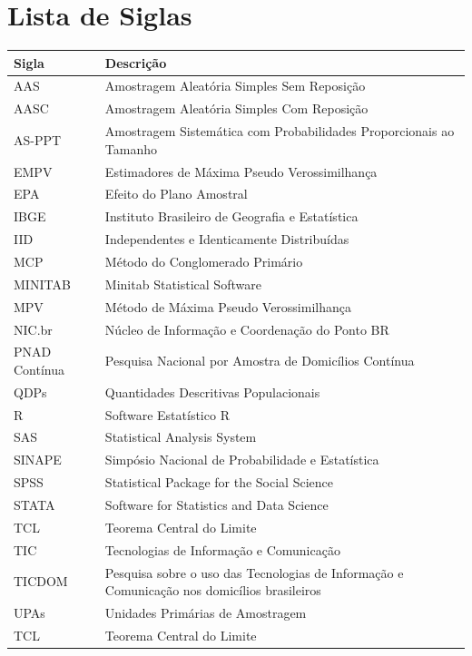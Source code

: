 \documentclass[
  12pt,
  brazilian,
]{book}
\theoremstyle{definition}
\theoremstyle{definition}
\theoremstyle{definition}
\theoremstyle{definition}
\theoremstyle{remark}
\begin{document}
\hypertarget{lista-de-siglas}{%
\chapter*{Lista de Siglas}\label{lista-de-siglas}}

\begin{longtable}[]{@{}
  >{\raggedright\arraybackslash}p{}
  >{\raggedright\arraybackslash}p{}@{}}
\toprule
Sigla & Descrição \\
\midrule
\endhead
AAS & Amostragem Aleatória Simples Sem Reposição \\
AASC & Amostragem Aleatória Simples Com Reposição \\
AS-PPT & Amostragem Sistemática com Probabilidades Proporcionais ao Tamanho \\
EMPV & Estimadores de Máxima Pseudo Verossimilhança \\
EPA & Efeito do Plano Amostral \\
IBGE & Instituto Brasileiro de Geografia e Estatística \\
IID & Independentes e Identicamente Distribuídas \\
MCP & Método do Conglomerado Primário \\
MINITAB & Minitab Statistical Software \\
MPV & Método de Máxima Pseudo Verossimilhança \\
NIC.br & Núcleo de Informação e Coordenação do Ponto BR \\
PNAD Contínua & Pesquisa Nacional por Amostra de Domicílios Contínua \\
QDPs & Quantidades Descritivas Populacionais \\
R & Software Estatístico R \\
SAS & Statistical Analysis System \\
SINAPE & Simpósio Nacional de Probabilidade e Estatística \\
SPSS & Statistical Package for the Social Science \\
STATA & Software for Statistics and Data Science \\
TCL & Teorema Central do Limite \\
TIC & Tecnologias de Informação e Comunicação \\
TICDOM & Pesquisa sobre o uso das Tecnologias de Informação e Comunicação nos domicílios brasileiros \\
UPAs & Unidades Primárias de Amostragem \\
TCL & Teorema Central do Limite \\
\bottomrule
\end{longtable}
\end{document}
